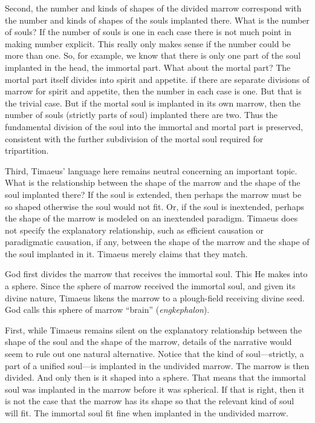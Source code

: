 Second, the number and kinds of shapes of the divided marrow correspond with the number and kinds of shapes of the souls implanted there. What is the number of souls? If the number of souls is one in each case there is not much point in making number explicit. This really only makes sense if the number could be more than one. So, for example, we know that there is only one part of the soul implanted in the head, the immortal part. What about the mortal part? The mortal part itself divides into spirit and appetite. if there are separate divisions of marrow for spirit and appetite, then the number in each case is one. But that is the trivial case. But if the mortal soul is implanted in its own marrow, then the number of souls (strictly parts of soul) implanted there are two. Thus the fundamental division of the soul into the immortal and mortal part is preserved, consistent with the further subdivision of the mortal soul required for tripartition.

Third, Timaeus' language here remains neutral concerning an important topic. What is the relationship between the shape of the marrow and the shape of the soul implanted there? If the soul is extended, then perhaps the marrow must be so shaped otherwise the soul would not fit. Or, if the soul is inextended, perhaps the shape of the marrow is modeled on an inextended paradigm. Timaeus does not specify the explanatory relationship, such as efficient causation or paradigmatic causation, if any, between the shape of the marrow and the shape of the soul implanted in it. Timaeus merely claims that they match.

God first divides the marrow that receives the immortal soul. This He makes into a sphere. Since the sphere of marrow received the immortal soul, and given its divine nature, Timaeus likens the marrow to a plough-field receiving divine seed. God calls this sphere of marrow ``brain'' (\emph{engkephalon}).

First, while Timaeus remains silent on the explanatory relationship between the shape of the soul and the shape of the marrow, details of the narrative would seem to rule out one natural alternative. Notice that the kind of soul---strictly, a part of a unified soul---is implanted in the undivided marrow. The marrow is then divided. And only then is it shaped into a sphere. That means that the immortal soul was implanted in the marrow before it was spherical. If that is right, then it is not the case that the marrow has its shape so that the relevant kind of soul will fit. The immortal soul fit fine when implanted in the undivided marrow.

